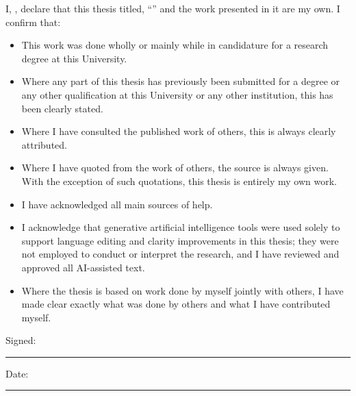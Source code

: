 \documentclass[
12pt, %
english, %
singlespacing, %
headsepline, %
]{MastersDoctoralThesis} %
\begin{document}

\begin{declaration}
\addchaptertocentry{\authorshipname} %
\noindent I, \authorname, declare that this thesis titled, \enquote{\ttitle} and the work presented in it are my own. I confirm that:

\begin{itemize} 
\item This work was done wholly or mainly while in candidature for a research degree at this University.
\item Where any part of this thesis has previously been submitted for a degree or any other qualification at this University or any other institution, this has been clearly stated.
\item Where I have consulted the published work of others, this is always clearly attributed.
\item Where I have quoted from the work of others, the source is always given. With the exception of such quotations, this thesis is entirely my own work.
\item I have acknowledged all main sources of help.
\item I acknowledge that generative artificial intelligence tools were used solely to support language editing and clarity improvements in this thesis; they were not employed to conduct or interpret the research, and I have reviewed and approved all AI-assisted text.
\item Where the thesis is based on work done by myself jointly with others, I have made clear exactly what was done by others and what I have contributed myself.\\
\end{itemize}
 
\noindent Signed:\\
\rule[0.5em]{25em}{0.5pt} %
 
\noindent Date:\\
\rule[0.5em]{25em}{0.5pt} %
\end{declaration}

\cleardoublepage

\end{document}

